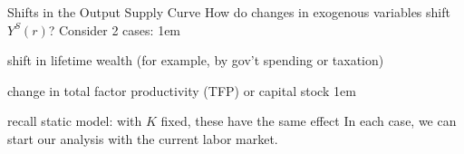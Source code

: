 \documentclass[11pt,aspectratio=43,usenames,dvipsnames]{beamer}
\let\olditemize=\itemize
\let\endolditemize=\enditemize
\renewenvironment{itemize}{\olditemize \itemsep1em}{\endolditemize}
\let\oldenumerate=\enumerate
\let\endoldenumerate=\endenumerate
\renewenvironment{enumerate}{\oldenumerate \itemsep1em}{ \endoldenumerate}
\theoremstyle{definition}
\begin{document}
\begin{frame}{Shifts in the Output Supply Curve}
\label{slide:Shifts_in_the_Output_Supply_Curve}
    How do changes in exogenous variables shift $ Y^{S}( r ) $? Consider 2 cases:
    \begin{enumerate}
        \item shift in lifetime wealth (for example, by gov’t spending or taxation)
        \item change in total factor productivity (TFP) or capital stock
        \begin{itemize}
            \item recall static model: with $ K $ fixed, these have the same effect
        \end{itemize}
    \end{enumerate}
    In each case, we can start our analysis with the current labor market.
\end{frame}
\end{document}
